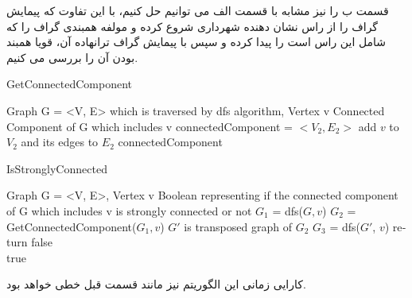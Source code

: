 \documentclass{article}
\begin{document}
    قسمت ب را نیز مشابه با قسمت الف می توانیم حل کنیم، با این تفاوت که پیمایش
    گراف را از راس نشان دهنده شهرداری شروع کرده و مولفه همبندی گراف را که شامل این راس است را پیدا کرده و سپس
    با پیمایش گراف ترانهاده آن، قویا همبند بودن آن را بررسی می کنیم.
    \begin{latin}
        \begin{algorithm}[H]
            \caption{GetConnectedComponent}
            \begin{algorithmic}
                \Require Graph G = <V, E> which is traversed by dfs algorithm, Vertex v
                \Ensure Connected Component of G which includes v
                \State connectedComponent = $<V_2, E_2>$
                        \State add $v$ to $V_2$ and its edges to $E_2$
                    \EndIf
                \EndFor
                \State \Return connectedComponent
                
            \end{algorithmic}
        \end{algorithm}
    \end{latin}

    \begin{latin}
        \begin{algorithm}[H]
            \caption{IsStronglyConnected}
            \begin{algorithmic}
                \Require Graph G = <V, E>, Vertex v
                \Ensure Boolean representing if the connected component of G which includes v is strongly connected or not
                \State $G_1$ = dfs($G, v$)
                \State $G_2$ = GetConnectedComponent($G_1, v$)
                \State $G'$ is transposed graph of $G_2$
                \State $G_3$ = dfs($G'$, $v$)
                    \State return false
                \EndIf
                \EndFor
                \\
                \State \Return true
            \end{algorithmic}
        \end{algorithm}
    \end{latin}

    کارایی زمانی این الگوریتم نیز مانند قسمت قبل خطی خواهد بود.
\end{document}
